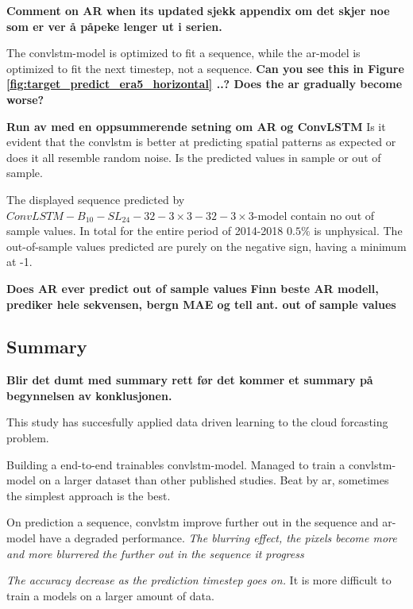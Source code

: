 \textbf{Comment on AR when its updated}
\textbf{sjekk appendix om det skjer noe som er ver å påpeke lenger ut i serien.}

The \acrshort{convlstm}-model is optimized to fit a sequence, while the \acrshort{ar}-model is optimized to fit the next timestep, not a sequence.
\textbf{Can you see this in Figure \ref{fig:target_predict_era5_horizontal} ..? Does the ar gradually become worse?}

\textbf{Run av med en oppsummerende setning om AR og ConvLSTM}
Is it evident that the \acrshort{convlstm} is better at predicting spatial patterns as expected or does it all resemble random noise. Is the predicted values in sample or out of sample.

The displayed sequence predicted by $ConvLSTM-B_{10}-SL_{24}-32-3\times3-32-3 \times3$-model contain no out of sample values. In total for the entire period of 2014-2018 $0.5\%$ is unphysical. The out-of-sample values predicted are purely on the negative sign, having a minimum at -1. 

\textbf{Does AR ever predict out of sample values}
\textbf{Finn beste AR modell, prediker hele sekvensen, bergn MAE og tell ant. out of sample values}



\subsection{Summary} \label{sec:summary_num}
\textbf{Blir det dumt med summary rett før det kommer et summary på begynnelsen av konklusjonen.}

This study has succesfully applied data driven learning to the cloud forcasting problem. 

Building a end-to-end trainables \acrshort{convlstm}-model. Managed to train a \acrshort{convlstm}-model on a larger dataset than other published studies. Beat by \acrshort{ar}, sometimes the simplest approach is the best. 

On prediction a sequence, \acrshort{convlstm} improve further out in the sequence and \acrshort{ar}-model have a degraded performance.
\textit{The blurring effect, the pixels become more and more blurrered the further out in the sequence it progress}

\textit{The accuracy decrease as the prediction timestep goes on.}
It is more difficult to train a models on a larger amount of data. 
